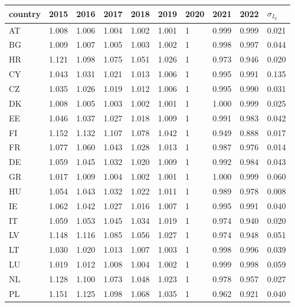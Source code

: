 \documentclass[12pt]{article}
\begin{document}
\begin{table}[h!]
\centering
\begin{tabular}{l|lllllllll}
country & 2015  & 2016  & 2017  & 2018  & 2019  & 2020 & 2021  & 2022  & $\sigma_{I_\eta}$ \\ \hline
AT      & 1.008 & 1.006 & 1.004 & 1.002 & 1.001 & 1    & 0.999 & 0.999 & 0.021       \\
BG      & 1.009 & 1.007 & 1.005 & 1.003 & 1.002 & 1    & 0.998 & 0.997 & 0.044       \\
HR      & 1.121 & 1.098 & 1.075 & 1.051 & 1.026 & 1    & 0.973 & 0.946 & 0.020       \\
CY      & 1.043 & 1.031 & 1.021 & 1.013 & 1.006 & 1    & 0.995 & 0.991 & 0.135       \\
CZ      & 1.035 & 1.026 & 1.019 & 1.012 & 1.006 & 1    & 0.995 & 0.990 & 0.031       \\
DK      & 1.008 & 1.005 & 1.003 & 1.002 & 1.001 & 1    & 1.000 & 0.999 & 0.025       \\
EE      & 1.046 & 1.037 & 1.027 & 1.018 & 1.009 & 1    & 0.991 & 0.983 & 0.042       \\
FI      & 1.152 & 1.132 & 1.107 & 1.078 & 1.042 & 1    & 0.949 & 0.888 & 0.017       \\
FR      & 1.077 & 1.060 & 1.043 & 1.028 & 1.013 & 1    & 0.987 & 0.976 & 0.014       \\
DE      & 1.059 & 1.045 & 1.032 & 1.020 & 1.009 & 1    & 0.992 & 0.984 & 0.043       \\
GR      & 1.017 & 1.009 & 1.004 & 1.002 & 1.001 & 1    & 1.000 & 0.999 & 0.060       \\
HU      & 1.054 & 1.043 & 1.032 & 1.022 & 1.011 & 1    & 0.989 & 0.978 & 0.008       \\
IE      & 1.062 & 1.042 & 1.027 & 1.016 & 1.007 & 1    & 0.995 & 0.991 & 0.040       \\
IT      & 1.059 & 1.053 & 1.045 & 1.034 & 1.019 & 1    & 0.974 & 0.940 & 0.020       \\
LV      & 1.148 & 1.116 & 1.085 & 1.056 & 1.027 & 1    & 0.974 & 0.948 & 0.051       \\
LT      & 1.030 & 1.020 & 1.013 & 1.007 & 1.003 & 1    & 0.998 & 0.996 & 0.039       \\
LU      & 1.019 & 1.012 & 1.008 & 1.004 & 1.002 & 1    & 0.999 & 0.998 & 0.059       \\
NL      & 1.128 & 1.100 & 1.073 & 1.048 & 1.023 & 1    & 0.978 & 0.957 & 0.027       \\
PL      & 1.151 & 1.125 & 1.098 & 1.068 & 1.035 & 1    & 0.962 & 0.921 & 0.040       \\

\end{tabular}
\end{table}
\end{document}

